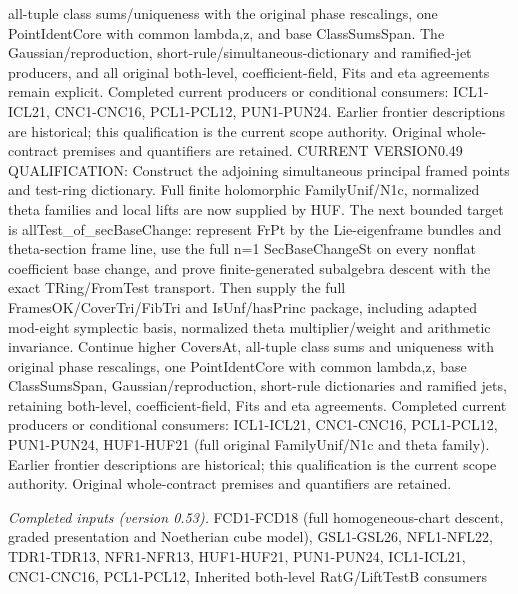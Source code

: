 \documentclass[11pt,a4paper]{article}
\numberwithin{equation}{section}
\theoremstyle{remark}\newtheorem{remark}[theorem]{Remark}
\begin{document}
all-tuple class sums/uniqueness with the original phase rescalings, one PointIdentCore with common lambda,z, and base ClassSumsSpan. The Gaussian/reproduction, short-rule/simultaneous-dictionary and ramified-jet producers, and all original both-level, coefficient-field, Fits and eta agreements remain explicit. Completed current producers or conditional consumers: ICL1-ICL21, CNC1-CNC16, PCL1-PCL12, PUN1-PUN24. Earlier frontier descriptions are historical; this qualification is the current scope authority. Original whole-contract premises and quantifiers are retained. CURRENT VERSION0.49 QUALIFICATION: Construct the adjoining simultaneous principal framed points and test-ring dictionary. Full finite holomorphic FamilyUnif/N1c, normalized theta families and local lifts are now supplied by HUF. The next bounded target is allTest\_\allowbreak of\_\allowbreak secBaseChange: represent FrPt by the Lie-eigenframe bundles and theta-section frame line, use the full n=1 SecBaseChangeSt on every nonflat coefficient base change, and prove finite-generated subalgebra descent with the exact TRing/FromTest transport. Then supply the full FramesOK/CoverTri/FibTri and IsUnf/hasPrinc package, including adapted mod-eight symplectic basis, normalized theta multiplier/weight and arithmetic invariance. Continue higher CoversAt, all-tuple class sums and uniqueness with original phase rescalings, one PointIdentCore with common lambda,z, base ClassSumsSpan, Gaussian/reproduction, short-rule dictionaries and ramified jets, retaining both-level, coefficient-field, Fits and eta agreements. Completed current producers or conditional consumers: ICL1-ICL21, CNC1-CNC16, PCL1-PCL12, PUN1-PUN24, HUF1-HUF21 (full original FamilyUnif/N1c and theta family). Earlier frontier descriptions are historical; this qualification is the current scope authority. Original whole-contract premises and quantifiers are retained.

\emph{Completed inputs (version 0.53).} FCD1-FCD18 (full homogeneous-chart descent, graded presentation and Noetherian cube model), GSL1-GSL26, NFL1-NFL22, TDR1-TDR13, NFR1-NFR13, HUF1-HUF21, PUN1-PUN24, ICL1-ICL21, CNC1-CNC16, PCL1-PCL12, Inherited both-level RatG/LiftTestB consumers
\end{document}
